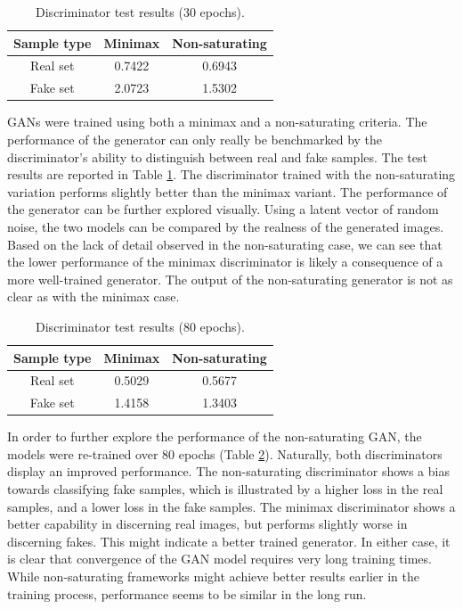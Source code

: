 \documentclass[11pt]{article} %
\begin{document}
\begin{table}
    \begin{tabular}{c|cc}
        Sample type & Minimax & Non-saturating\\
        \hline
        Real set & 0.7422 & 0.6943\\
        Fake set & 2.0723 & 1.5302\\
        
    \end{tabular}
    \caption{Discriminator test results (30 epochs).}
    \label{tab:GAN_results30}
\end{table}

GANs were trained using both a minimax and a non-saturating criteria. The performance of the generator can only really be benchmarked by the discriminator's ability to distinguish between real and fake samples.  The test results are reported in Table \ref{tab:GAN_results30}. The discriminator trained with the non-saturating variation performs slightly better than the minimax variant. The performance of the generator can be further explored visually. Using a latent vector of random noise, the two models can be compared by the realness of the generated images. Based on the lack of detail observed in the non-saturating case, we can see that the lower performance of the minimax discriminator is likely a consequence of a more well-trained generator. The output of the non-saturating generator is not as clear as with the minimax case.

\begin{table}
    \begin{tabular}{c|cc}
        Sample type & Minimax & Non-saturating\\
        \hline
        Real set & 0.5029 & 0.5677\\
        Fake set & 1.4158 & 1.3403\\
        
    \end{tabular}
    \caption{Discriminator test results (80 epochs).}
    \label{tab:GAN_results80}
\end{table}

In order to further explore the performance of the non-saturating GAN, the models were re-trained over 80 epochs (Table \ref{tab:GAN_results80}). Naturally, both discriminators display an improved performance. The non-saturating discriminator shows a bias towards classifying fake samples, which is illustrated by a higher loss in the real samples, and a lower loss in the fake samples. The minimax discriminator shows a better capability in discerning real images, but performs slightly worse in discerning fakes. This might indicate a better trained generator. In either case, it is clear that convergence of the GAN model requires very long training times. While non-saturating frameworks might achieve better results earlier in the training process, performance seems to be similar in the long run.
\end{document}
